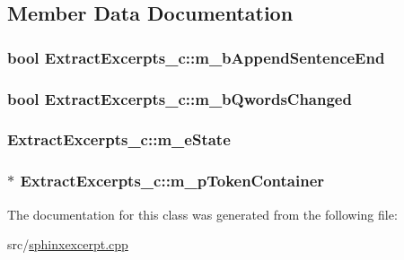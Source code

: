 \subsection{Member Data Documentation}
\hypertarget{classExtractExcerpts__c_ac710a1fe715fd94dd7fe56211c0e0a0a}{
\subsubsection[{m\-\_\-b\-Append\-Sentence\-End}]{\setlength{\rightskip}{0pt plus 5cm}bool Extract\-Excerpts\-\_\-c\-::m\-\_\-b\-Append\-Sentence\-End\hspace{0.3cm}{\ttfamily [private]}}}\label{classExtractExcerpts__c_ac710a1fe715fd94dd7fe56211c0e0a0a}
\hypertarget{classExtractExcerpts__c_adf9f1c150c58be2501dcd00e71c5166c}{
\subsubsection[{m\-\_\-b\-Qwords\-Changed}]{\setlength{\rightskip}{0pt plus 5cm}bool Extract\-Excerpts\-\_\-c\-::m\-\_\-b\-Qwords\-Changed\hspace{0.3cm}{\ttfamily [private]}}}\label{classExtractExcerpts__c_adf9f1c150c58be2501dcd00e71c5166c}
\hypertarget{classExtractExcerpts__c_a6dfa8c0bc046ebf1774573188a862a6f}{
\subsubsection[{m\-\_\-e\-State}]{ Extract\-Excerpts\-\_\-c\-::m\-\_\-e\-State\hspace{0.3cm}{\ttfamily [private]}}}\label{classExtractExcerpts__c_a6dfa8c0bc046ebf1774573188a862a6f}
\hypertarget{classExtractExcerpts__c_a827c5a10b3ba16498b2d239487d5cc95}{
\subsubsection[{m\-\_\-p\-Token\-Container}]{$\ast$ Extract\-Excerpts\-\_\-c\-::m\-\_\-p\-Token\-Container\hspace{0.3cm}{\ttfamily [private]}}}\label{classExtractExcerpts__c_a827c5a10b3ba16498b2d239487d5cc95}


The documentation for this class was generated from the following file\-:\begin{DoxyCompactItemize}
\item 
src/\hyperlink{sphinxexcerpt_8cpp}{sphinxexcerpt.\-cpp}\end{DoxyCompactItemize}
